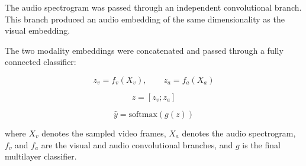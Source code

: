 \documentclass[lineno]{wlpeerj}
\begin{document}
The audio spectrogram was passed through an independent convolutional branch. This branch produced an audio embedding of the same dimensionality as the visual embedding.

The two modality embeddings were concatenated and passed through a fully connected classifier:

\begin{equation}
	z_v = f_v(X_v), \qquad z_a = f_a(X_a)
\end{equation}

\begin{equation}
	z = [z_v ; z_a]
\end{equation}

\begin{equation}
	\hat{y} = \mathrm{softmax}(g(z))
\end{equation}

where $X_v$ denotes the sampled video frames, $X_a$ denotes the audio spectrogram, $f_v$ and $f_a$ are the visual and audio convolutional branches, and $g$ is the final multilayer classifier.
\end{document}
